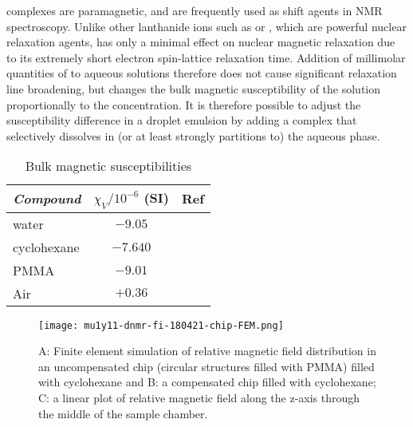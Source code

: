  complexes are paramagnetic, and are frequently used as
shift agents in NMR spectroscopy. Unlike other lanthanide ions such
as  or , which are powerful nuclear relaxation
agents,  has only a minimal
effect on nuclear magnetic relaxation due to its extremely
short electron spin-lattice relaxation time.\cite{Peters:1996bj} Addition of
millimolar quantities of  to aqueous solutions
therefore does not cause significant relaxation line broadening, but changes
the bulk magnetic susceptibility of the solution proportionally
to the  concentration. It is therefore possible
to adjust the susceptibility difference in a droplet emulsion
by adding a  complex that selectively dissolves in (or at least
strongly partitions to) the aqueous phase.


\begin{table}
  \begin{center}
    \caption{Bulk magnetic susceptibilities
    \label{tab:suscept}}
    \begin{tabular}{lcc}\hline\hline
      \emph{Compound} & $\chi_V/10^{-6}$ (SI) & Ref \\ \hline
      water           & $-9.05$               &    \cite{Rumble:2017tp}  \\
      cyclohexane     & $-7.640$              &    \cite{Rumble:2017tp} \\
      PMMA            & $-9.01$               &    \cite{Wapler:2014es}\\
      Air             & $+0.36$               &    \cite{Bakker:2006eea} \\ \hline\hline
    \end{tabular}
  \end{center}
\end{table}



\begin{figure}
  \begin{center}
    \texttt{[image: mu1y11-dnmr-fi-180421-chip-FEM.png]}
  \end{center}
  \caption{A: Finite element simulation of relative magnetic field distribution in an uncompensated chip (circular structures filled with PMMA) filled with cyclohexane
      and B: a compensated chip filled with cyclohexane; C: a linear plot of relative magnetic field along the z-axis through the middle of the sample chamber.
    }
  \label{fig:FEM-chip}
\end{figure}


